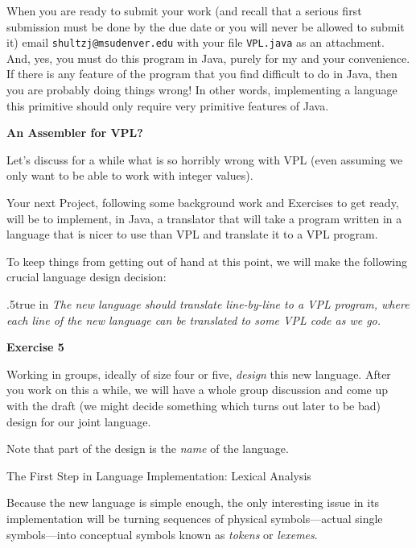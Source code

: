 When you are ready to submit your work (and recall that a serious first submission must be done by the due date or
you will never be allowed to submit it)
email\hfil\break
 {\tt shultzj@msudenver.edu} with your file {\tt VPL.java} as an attachment.
And, yes, you must do this program in Java, purely for my and your convenience.  If there is
any feature of the program that you find difficult to do in Java, then you are probably
doing things wrong!  In other words, implementing a language this primitive should only
require very primitive features of Java.
\border

\vfil\eject


{\bf An Assembler for VPL?}
\medskip

\doit Let's discuss for a while what is so horribly wrong with VPL (even assuming we only want to
be able to work with integer values).
\medskip

Your next Project, following some background work and Exercises to get ready, will be to implement, in Java, a
translator that will take a program written in a language that is nicer to use than VPL and
translate it to a VPL program.
\medskip

To keep things from getting out of hand at this point, we will make the following crucial language design
decision:
\medskip

{\advance \leftskip .5true in
   \it The new language should translate line-by-line to a VPL program, where each line of the
   new language can be translated to some VPL code as we go.
\border
}

{\bf Exercise 5} 
\medskip

Working in groups, ideally of size four or five, {\it design\/} this new language.
After you work on this a while, we will have a whole group discussion and come up with
the draft (we might decide something which turns out later to be bad) design for our
joint language.
\medskip

Note that part of the design is the {\it name\/} of the language.
\border

{\bigboldfont The First Step in Language Implementation:  Lexical Analysis}
\bigskip

Because the new language is simple enough, the only interesting issue in its implementation
will be turning sequences of physical symbols---actual single symbols---into conceptual symbols known as
{\it tokens\/} or {\it lexemes}.
\medskip

